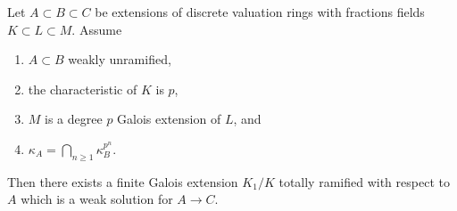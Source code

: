 %
\begin{lemma}
\label{lemma-characteristic-p-case}
Let $A \subset B \subset C$ be extensions of discrete valuation rings
with fractions fields $K \subset L \subset M$. Assume
\begin{enumerate}
\item $A \subset B$ weakly unramified,
\item the characteristic of $K$ is $p$,
\item $M$ is a degree $p$ Galois extension of $L$, and
\item $\kappa_A = \bigcap_{n \geq 1} \kappa_B^{p^n}$.
\end{enumerate}
Then there exists a finite Galois extension $K_1/K$
totally ramified with respect to $A$
which is a weak solution for $A \to C$.
\end{lemma}

